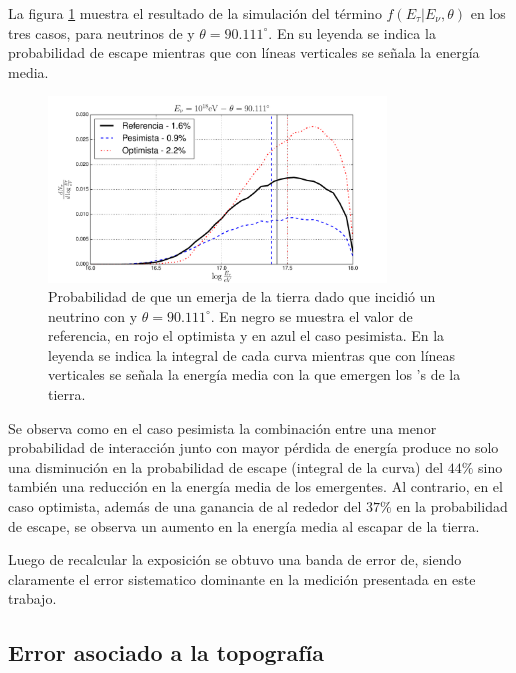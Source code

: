 	La figura \ref{fig:pdfSyst} muestra el resultado de la simulación del término $f(E_\tau|E_\nu,\theta)$ en los tres casos, para neutrinos de  y $\theta=90.111^\circ$.
	En su leyenda se indica la probabilidad de escape mientras que con líneas verticales se señala la energía media.
	\begin{figure}[ht!]
		\begin{center}
			\includegraphics[width=0.8\textwidth]{fig/resultadosAuger/pdfSyst}
			\caption{Probabilidad de que un \tauon{} emerja de la tierra dado que incidió un neutrino con  y $\theta=90.111^\circ$. En negro se muestra el valor de referencia, en rojo el optimista y en azul el caso pesimista. En la leyenda se indica la integral de cada curva mientras que con líneas verticales se señala la energía media con la que emergen los \tauon{}'s de la tierra.}
			\label{fig:pdfSyst}
		\end{center}
	\end{figure}
	Se observa como en el caso pesimista la combinación entre una menor probabilidad de interacción junto con mayor pérdida de energía produce no solo una disminución en la probabilidad de escape (integral de la curva) del $44\%$ sino también una reducción en la energía media de los \tauon{} emergentes.
	Al contrario, en el caso optimista, además de una ganancia de al rededor del $37\%$ en la probabilidad de escape, se observa un aumento en la energía media al escapar de la tierra.
	
	Luego de recalcular la exposición se obtuvo una banda de error de\linebreak {}, siendo claramente el error sistematico dominante en la medici\'on presentada en este trabajo.
	
	\subsection{Error asociado a la topografía}
	
